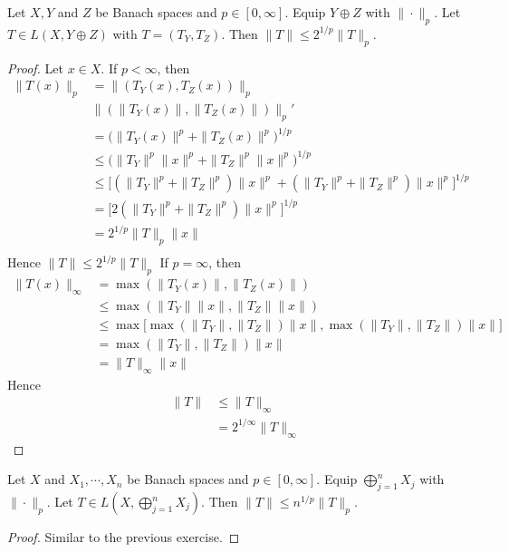 \documentclass{book}
\begin{document}
	
	\begin{ex}
	Let $X, Y$ and $Z$ be Banach spaces and $p \in [0, \infty]$. Equip $Y \oplus Z$ with $\|\cdot\|_p$. Let $T \in L(X, Y \oplus Z)$ with $T = (T_Y, T_Z)$. Then $\|T\|\leq 2^{1/p}\|T\|_p$.
	\end{ex}
	
	\begin{proof}
	Let $x \in X$. If $p < \infty$, then
	\begin{align*}
	\|T(x)\|_p
	&= \|(T_Y(x), T_Z(x))\|_p \\
	& \|( \|T_Y(x)\|, \|T_Z(x)\|)\|_p' \\
	&=  \bigg(\|T_Y(x) \|^p +  \|T_Z(x) \|^p \bigg)^{1/p} \\
	& \leq \bigg(\|T_Y\|^p\|x\|^p +  \|T_Z\|^p\|x\|^p \bigg)^{1/p} \\
	& \leq \bigg[ (\|T_Y\|^p+ \|T_Z\|^p)\|x\|^p +  (\|T_Y\|^p + \|T_Z\|^p)\|x\|^p \bigg ]^{1/p} \\
	&= \bigg[ 2(\|T_Y\|^p + \|T_Z\|^p)\|x\|^p \bigg ]^{1/p} \\
	&= 2^{1/p}\|T\|_p\|x\| \\
	\end{align*}
	Hence $\|T\| \leq 2^{1/p}\|T\|_p$
	If $p = \infty$, then 
	\begin{align*}
	\|T(x)\|_{\infty} 
	&= \max(\|T_Y(x) \|, \|T_Z(x)\|) \\
	& \leq \max(\|T_Y\|\|x \|, \|T_Z\|\|x\|) \\
	& \leq \max \bigg[ \max (\|T_Y\|, \|T_Z\|)\|x \|, \max(\|T_Y\| ,\|T_Z\|)\|x\| \bigg] \\
	&= \max(\|T_Y\| ,\|T_Z\|) \|x\|\\
	&= \|T\|_{\infty} \|x\|
	\end{align*}
	Hence 
	\begin{align*}
	\|T\| 
	& \leq \|T\|_{\infty} \\
	&= 2^{1/\infty}\|T\|_{\infty}
	\end{align*}
	\end{proof}
	
	\begin{ex}
	Let $X$ and $X_1, \cdots, X_n$ be Banach spaces and $p \in [0, \infty]$. Equip $\bigoplus\limits_{j=1}^n X_j$ with $\|\cdot\|_p$. Let $T \in L(X, \bigoplus\limits_{j=1}^n X_j)$. Then $\|T\|\leq n^{1/p}\|T\|_p$.
	\end{ex}
	
	\begin{proof}
	Similar to the previous exercise.
	\end{proof}
	
\end{document}
